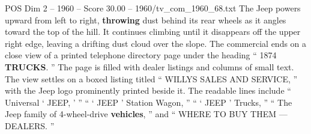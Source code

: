\begin{textsample}{POS Dim 2 – 1960 – Score 30.00 – 1960/tv\_com\_1960\_68.txt}
The Jeep powers upward from left to right, \textbf{throwing} dust behind its rear wheels as it angles toward the top of the hill.
It continues climbing until it disappears off the upper right edge, leaving a drifting dust cloud over the slope.
The commercial ends on a close view of a printed telephone directory page under the heading “ 1874 \textbf{TRUCKS}. ” The page is filled with dealer listings and columns of small text.
The view settles on a boxed listing titled “ WILLYS SALES AND SERVICE, ” with the Jeep logo prominently printed beside it.
The readable lines include “ Universal ‘ JEEP, ’ ” “ ‘ JEEP ’ Station Wagon, ” “ ‘ JEEP ’ Trucks, ” “ The Jeep family of 4-wheel-drive \textbf{vehicles}, ” and “ WHERE TO BUY THEM — DEALERS. ”

\end{textsample}
